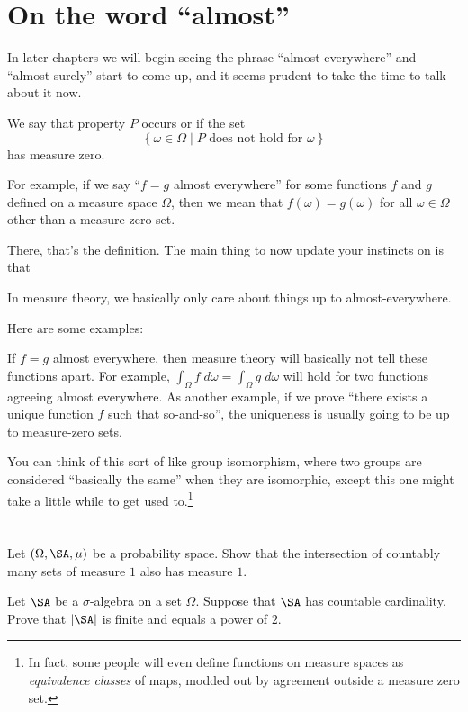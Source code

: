 \section{On the word ``almost''}
In later chapters we will begin seeing the phrase ``almost everywhere''
and ``almost surely'' start to come up,
and it seems prudent to take the time to talk about it now.

\begin{definition}
	We say that property $P$ occurs
	 or  if the set
	\[ \left\{ \omega \in \Omega \mid \text{$P$ does not hold for $\omega$} \right\} \]
	has measure zero.
\end{definition}

For example, if we say ``$f = g$ almost everywhere''
for some functions $f$ and $g$ defined on a measure space $\Omega$,
then we mean that $f(\omega) = g(\omega)$ for all $\omega \in \Omega$
other than a measure-zero set.

There, that's the definition.
The main thing to now update your instincts on is that
\begin{moral}
	In measure theory,
	we basically only care about things up to almost-everywhere.
\end{moral}
Here are some examples:
\begin{itemize}
	\ii If $f=g$ almost everywhere,
	then measure theory will basically not tell these functions apart.
	For example, $\int_\Omega f \; d\omega = \int_\Omega g \; d\omega$
	will hold for two functions agreeing almost everywhere.
	\ii As another example,
	if we prove ``there exists a unique function $f$ such that so-and-so'',
	the uniqueness is usually going to be up to measure-zero sets.
\end{itemize}
You can think of this sort of like group isomorphism,
where two groups are considered ``basically the same'' when they are isomorphic,
except this one might take a little while to get used to.\footnote{In fact,
	some people will even define functions on measure spaces
	as \emph{equivalence classes} of maps,
	modded out by agreement outside a measure zero set.}

\section{\problemhead}
\begin{dproblem}
	Let $(\Omega, \SA, \mu)$ be a probability space.
	Show that the intersection of countably many sets of measure $1$
	also has measure $1$.
\end{dproblem}

\begin{problem}
	\onechili
	Let $\SA$ be a $\sigma$-algebra on a set $\Omega$.
	Suppose that $\SA$ has countable cardinality.
	Prove that $|\SA|$ is finite and equals a power of $2$.
\end{problem}
